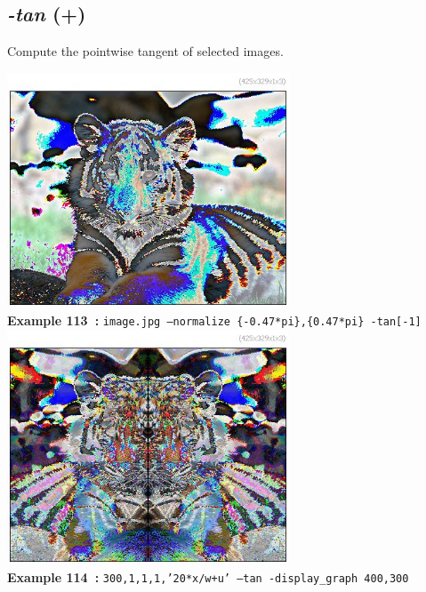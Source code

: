 \documentclass[a4paper,11pt,twoside]{book}
\begin{document}
\subsection{\emph{-tan} (+)}\vspace*{-0.5em}
Compute the pointwise tangent of selected images.
\begin{center}\includegraphics[keepaspectratio=true,height=7cm,width=\textwidth]{img/gmic_def113.jpg}\\
{\footnotesize \textbf{Example 113~:} \texttt{image.jpg --normalize \{-0.47*pi\},\{0.47*pi\} -tan[-1]}}
\\\includegraphics[keepaspectratio=true,height=7cm,width=\textwidth]{img/gmic_def114.jpg}\\
{\footnotesize \textbf{Example 114~:} \texttt{300,1,1,1,'20*x/w+u' --tan -display\_graph 400,300}}
\end{center}
\end{document}
